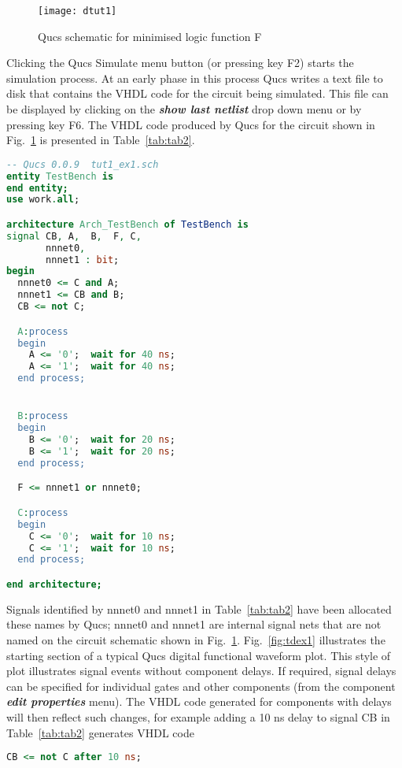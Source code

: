 \begin{figure}[ht]
  \centering
  \texttt{[image: dtut1]}
  \caption{Qucs schematic for minimised logic function F}
  \label{fig:dtut1}
\end{figure} 


Clicking the Qucs Simulate menu button (or pressing key F2) starts the
simulation process. At an early phase in this process Qucs writes a
text file to disk that contains the VHDL code for the circuit being
simulated.  This file can be displayed by clicking on the
\textit{\textbf{show last netlist}} drop down menu or by pressing key
F6. The VHDL code produced by Qucs for the circuit shown in
Fig.~\ref{fig:dtut1} is presented in Table~\ref{tab:tab2}.

\begin{table}
\begin{lstlisting}[language=VHDL]
-- Qucs 0.0.9  tut1_ex1.sch
entity TestBench is
end entity;
use work.all;

architecture Arch_TestBench of TestBench is
signal CB, A,  B,  F, C, 
       nnnet0, 
       nnnet1 : bit;
begin
  nnnet0 <= C and A;
  nnnet1 <= CB and B;
  CB <= not C;

  A:process
  begin
    A <= '0';  wait for 40 ns;
    A <= '1';  wait for 40 ns;
  end process;


  B:process
  begin
    B <= '0';  wait for 20 ns;
    B <= '1';  wait for 20 ns;
  end process;

  F <= nnnet1 or nnnet0;

  C:process
  begin
    C <= '0';  wait for 10 ns;
    C <= '1';  wait for 10 ns;
  end process;

end architecture;
\end{lstlisting}
\caption{VHDL code for the circuit shown in Fig.~\ref{fig:dtut1}}
\label{tab:tab2}
\end{table}

\addvspace{12pt}

Signals identified by nnnet0 and nnnet1 in Table~\ref{tab:tab2} have
been allocated these names by Qucs; nnnet0 and nnnet1 are internal
signal nets that are not named on the circuit schematic shown in
Fig.~\ref{fig:dtut1}.  Fig.~\ref{fig:tdex1} illustrates the starting
section of a typical Qucs digital functional waveform plot.  This
style of plot illustrates signal events without component delays.  If
required, signal delays can be specified for individual gates and
other components (from the component \textbf{\textit{edit properties}}
menu).  The VHDL code generated for components with delays will then
reflect such changes, for example adding a 10 ns delay to signal CB in
Table~\ref{tab:tab2} generates VHDL code
\begin{lstlisting}[language=VHDL]
CB <= not C after 10 ns;
\end{lstlisting}

